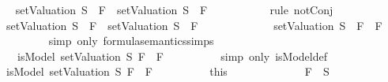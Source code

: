 \begin{isabellebody}
\ \isamarkupfalse%
\ {\isachardoublequoteopen}{\isasymnot}\ {\isacharparenleft}{\isacharparenleft}setValuation\ S{\isacharparenright}\ {\isasymTurnstile}\ F{}\ {\isasymand}\ {\isacharparenleft}setValuation\ S{\isacharparenright}\ {\isasymTurnstile}\ F{}{\isacharparenright}{\isachardoublequoteclose}\ \isanewline
\ \ \ \ \ \ \ \ \isamarkupfalse%
\ {\isacharparenleft}rule\ notConj{}{\isacharparenright}\isanewline
\ \ \ \ \ \ \isamarkupfalse%
\ \isamarkupfalse%
\ {\isachardoublequoteopen}{\isacharparenleft}{\isasymnot}\ {\isacharparenleft}{\isacharparenleft}setValuation\ S{\isacharparenright}\ {\isasymTurnstile}\ F{}\ {\isasymand}\ {\isacharparenleft}setValuation\ S{\isacharparenright}\ {\isasymTurnstile}\ F{}{\isacharparenright}{\isacharparenright}\ {\isacharequal}\ \isanewline
\ \ \ \ \ \ \ \ \ \ {\isacharparenleft}{\isasymnot}\ {\isacharparenleft}{\isacharparenleft}setValuation\ S{\isacharparenright}\ {\isasymTurnstile}\ F{}\ \isactrlbold {\isasymand}\ F{}{\isacharparenright}{\isacharparenright}{\isachardoublequoteclose}\isanewline
\ \ \ \ \ \ \ \ \isamarkupfalse%
\ {\isacharparenleft}simp\ only{\isacharcolon}\ formula{\isacharunderscore}semantics{\isachardot}simps{\isacharparenleft}{}{\isacharparenright}{\isacharparenright}\isanewline
\ \ \ \ \ \ \isamarkupfalse%
\ \isamarkupfalse%
\ {\isachardoublequoteopen}{\isasymdots}\ {\isacharequal}\ {\isacharparenleft}{\isasymnot}\ isModel\ {\isacharparenleft}setValuation\ S{\isacharparenright}\ {\isacharparenleft}F{}\ \isactrlbold {\isasymand}\ F{}{\isacharparenright}{\isacharparenright}{\isachardoublequoteclose}\isanewline
\ \ \ \ \ \ \ \ \isamarkupfalse%
\ {\isacharparenleft}simp\ only{\isacharcolon}\ isModel{\isacharunderscore}def{\isacharparenright}\isanewline
\ \ \ \ \ \ \isamarkupfalse%
\ \isamarkupfalse%
\ {\isachardoublequoteopen}{\isacharparenleft}{\isasymnot}\ isModel\ {\isacharparenleft}setValuation\ S{\isacharparenright}\ {\isacharparenleft}F{}\ \isactrlbold {\isasymand}\ F{}{\isacharparenright}{\isacharparenright}{\isachardoublequoteclose}\isanewline
\ \ \ \ \ \ \ \ \isamarkupfalse%
\ this\isanewline
\ \ \ \ \isamarkupfalse%
\isanewline
\ \ \ \ \ \ \isamarkupfalse%
\ {\isachardoublequoteopen}\isactrlbold {\isasymnot}\ F{}\ {\isasymin}\ S{\isachardoublequoteclose}\isanewline

\end{isabellebody}
